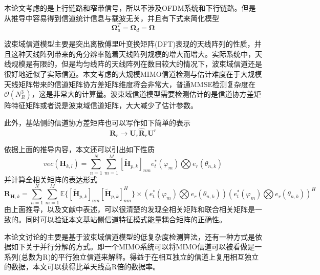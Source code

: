 \documentclass[bachelor,nocolorlinks, printoneside]{seuthesis} %
\begin{document}
\begin{Main}
本论文考虑的是上行链路和窄带信号，所以不涉及OFDM系统和下行链路。但是从推导中容易得到信道统计信息与载波无关，并且有下式来简化模型
\begin{equation}\label{key}
\bm{\Omega}_u^T = \bm{\Omega}_d =\bm{\Omega}
\end{equation}

波束域信道模型主要是突出离散傅里叶变换矩阵(DFT)表现的天线阵列的性质，并且这种天线阵列带来的角分辨率随着天线阵列规模的增大而增大。实际系统中，天线规模是有限的，但是均匀线阵的天线阵列在数目较大的情况下，波束域信道还是很好地近似了实际信道。本文考虑的大规模MIMO信道检测与估计难度在于大规模天线矩阵带来的信道矩阵协方差矩阵维度将会非常大，普通MMSE检测复杂度在$\mathcal{O}(N_R^3)$，这是非常大的计算量。波束域信道模型需要检测估计的是信道协方差矩阵特征矩阵或者说是波束域信道矩阵，大大减少了估计参数。

此外，基站侧的信道协方差矩阵也可以写作如下简单的表示
\begin{equation}\label{key}
\mathbf{R}_r \rightarrow \mathbf{U}_r \hat{\mathbf{R}}_r \mathbf{U}^{r}
\end{equation}

依据上面的推导内容，本文还可以引出如下性质
\begin{equation}\label{key}
vec(\mathbf{H}_{k,l}) = \sum_{n=1}^{N} \sum_{m=1}^{M} [\tilde{\mathbf{H}}_{p,k}]_{nm} e^{*}_{t}(\varphi_{m} )\bigotimes e_{r}(\theta_{n,k})
\end{equation}
并计算全相关矩阵的表达形式
\begin{equation}\label{key}
\mathbf{R}_{\mathbf{H},k} = \sum_{n=1}^{N} \sum_{m=1}^{M} \mathbb{E} \lbrace [\tilde{\mathbf{H}}_{p,k}]_{nm} [\tilde{\mathbf{H}}_{p,k}]_{nm}^{H}   \rbrace \times
(e^{*}_{t}(\varphi_{m} )\bigotimes e_{r}(\theta_{n,k})) (e^{*}_{t}(\varphi_{m} )\bigotimes e_{r}(\theta_{n,k}))^{H}
\end{equation}
由上面推导，以及文献中表述，可以很清楚的发现全相关矩阵和联合相关矩阵是一致的。同时可以验证本文基站侧信道特征模式能量耦合矩阵的正确性。

本论文讨论的主要是基于波束域信道模型的低复杂度检测算法，还有一种方式是依据如下关于并行分解的方式。即一个MIMO系统可以将MIMO信道可以被看做是一系列(总数为R)的平行独立信道来解释。得益于在相互独立的信道上复用相互独立的数据，本文可以获得比单天线高R倍的数据率。


\end{Main}
\end{document}
